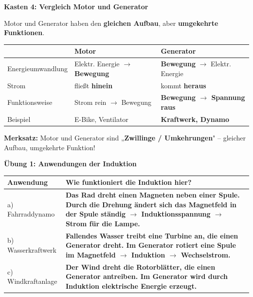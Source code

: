 \documentclass[11pt,a4paper]{article}
\newcommand{\aufgabe}[1]{\noindent\textbf{\textcolor{fachfarbe}{#1}}}
\newcommand{\lsg}[1]{\textcolor{loesung}{\textbf{#1}}}
\begin{document}
\begin{merkkasten}
\textbf{Kasten 4: Vergleich Motor und Generator}

\vspace{0.2em}
\small
Motor und Generator haben den \textbf{gleichen Aufbau}, aber \textbf{umgekehrte Funktionen}.

\vspace{0.3em}
\renewcommand{\arraystretch}{1.3}
\begin{tabular}{|p{3.5cm}|p{4.8cm}|p{5cm}|}
\hline
& \textbf{Motor} & \textbf{Generator} \\
\hline
Energieumwandlung & Elektr. Energie $\rightarrow$ \lsg{Bewegung} & \lsg{Bewegung} $\rightarrow$ Elektr. Energie \\
\hline
Strom & fließt \lsg{hinein} & kommt \lsg{heraus} \\
\hline
Funktionsweise & Strom rein $\rightarrow$ Bewegung & \lsg{Bewegung $\rightarrow$ Spannung raus} \\
\hline
Beispiel & E-Bike, Ventilator & \lsg{Kraftwerk, Dynamo} \\
\hline
\end{tabular}

\vspace{0.3em}
\textbf{Merksatz:} Motor und Generator sind „\lsg{Zwillinge / Umkehrungen}" -- gleicher Aufbau, umgekehrte Funktion!
\end{merkkasten}

\vspace{0.4em}

\aufgabe{Übung 1: Anwendungen der Induktion}

\vspace{0.2em}
{\small
\renewcommand{\arraystretch}{1.2}
\begin{tabular}{|p{3cm}|p{11cm}|}
\hline
\textbf{Anwendung} & \textbf{Wie funktioniert die Induktion hier?} \\
\hline
a) Fahrraddynamo & \lsg{Das Rad dreht einen Magneten neben einer Spule. Durch die Drehung ändert sich das Magnetfeld in der Spule ständig $\rightarrow$ Induktionsspannung $\rightarrow$ Strom für die Lampe.} \\[0.1cm]
\hline
b) Wasserkraftwerk & \lsg{Fallendes Wasser treibt eine Turbine an, die einen Generator dreht. Im Generator rotiert eine Spule im Magnetfeld $\rightarrow$ Induktion $\rightarrow$ Wechselstrom.} \\[0.1cm]
\hline
c) Windkraftanlage & \lsg{Der Wind dreht die Rotorblätter, die einen Generator antreiben. Im Generator wird durch Induktion elektrische Energie erzeugt.} \\[0.1cm]
\hline
\end{tabular}
}
\end{document}
